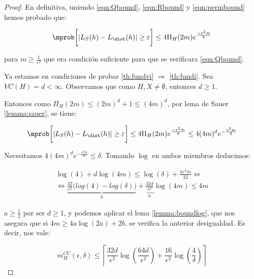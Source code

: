 \begin{proof}
  En definitiva, uniendo \eqref{eqn:Qbound}, \eqref{eqn:Rbound} y \eqref{eqn:permbound} hemos probado que:
  
  \begin{equation}
   \mprob \bigg[|L_S(h) - L_{\dist}(h)| \ge \varepsilon \bigg] \le 4 \Pi_H(2m) e^{\frac{-\varepsilon^2 m}{8}}
   \label{ineq:vcimpliesgc}
  \end{equation}
  
  para $m \ge \frac{1}{\varepsilon^2}$ que era condición suficiente para que se verificara \eqref{eqn:Qbound}.
  
  Ya estamos en condiciones de probar \ref{th:fundvi} $\Rightarrow$ \ref{th:fundi}. Sea $VC(H) = d < \infty$. Observamos
  que como $H,X \neq \emptyset$, entonces $d \ge 1$.
  
  Entonces como $\Pi_H(2m) \le (2m)^d + 1 \le (4m)^d$, por lema de Sauer \ref{lemma:sauer}, se tiene:
  
  \[\mprob \bigg[|L_S(h) - L_{\dist}(h)| \ge \varepsilon \bigg] 
    \le 4 \Pi_H(2m) e^{\frac{-\varepsilon^2 m}{8}} \le 4 (4m)^d e^{-\frac{\varepsilon^2 m}{8}}\]
 
  Necesitamos $4 (4m)^d e^{-\frac{\varepsilon^2 m}{8}} \le \delta$. Tomando $\log$ en ambos miembros deducimos:
  
  \begin{align*}
    \log(4) + d\log(4m) \le \log(\delta) + \frac{4\varepsilon^2 m}{32} \Leftrightarrow \\
    \Leftrightarrow \underbrace{\frac{32}{\varepsilon^2} \bigg(log(4) - log(\delta) \bigg)}_b + 
    \underbrace{\frac{32 d}{\epsilon^2}}_a \log(4m) \le 4m    
  \end{align*}
  
  $a \ge \frac{1}{2}$ por ser $d \ge 1$, y podemos aplicar el lema \ref{lemma:boundlog}, que nos asegura que si 
  $4m \ge 4a \log(2a) + 2b$, se verifica la anterior desigualdad. Es decir, nos vale:
  
  \[m_{H}^{CU}(\epsilon, \delta) \le \left\lceil\frac{32 d}{\epsilon^2} \log\left(\frac{64 d}{\epsilon^2}\right) + 
    \frac{16}{\epsilon^2} \log\left(\frac{4}{\delta}\right) \right\rceil \]
 
\end{proof}

